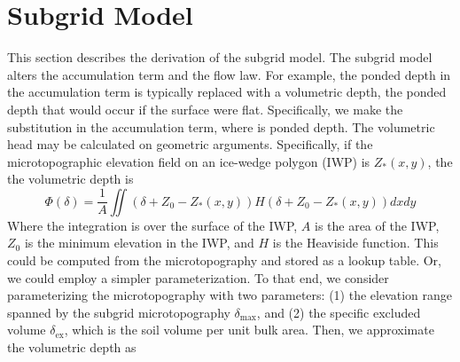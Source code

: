 \documentclass[review,11pt]{elsarticle}
\begin{document}
\section{Subgrid Model}\label{subgridmodel}
This section describes the derivation of the subgrid model. The subgrid model alters the accumulation term and the flow law. For example, the ponded depth in the accumulation term is typically replaced with a volumetric depth, the ponded depth that would occur if the surface were flat. Specifically, we make the substitution in the accumulation term, where is ponded depth. The volumetric head may be calculated on geometric arguments. Specifically, if the microtopographic elevation field on an ice-wedge polygon (IWP) is $Z_*(x,y)$, the the volumetric depth is
\begin{equation}\label{volumetric-depth1}
\Phi (\delta) = \frac{1}{A} \iint \left( \delta + Z_0 - Z_*(x,y) \right ) H \left( \delta + Z_0 - Z_*(x,y) \right ) dx dy
\end{equation}
Where the integration is over the surface of the IWP, $A$ is the area of the IWP, $Z_0$ is the minimum elevation in the IWP, and $H$ is the Heaviside function. This could be computed from the microtopography and stored as a lookup table. Or, we could employ a simpler parameterization. To that end, we consider parameterizing the microtopography with two parameters: (1) the elevation range spanned by the subgrid microtopography $\delta_\text{max}$, and (2) the specific excluded volume $\delta_\text{ex}$, which is the soil volume per unit bulk area. Then, we approximate the volumetric depth as
\end{document}
